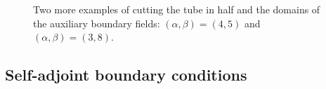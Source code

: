 \documentclass[12pt]{article}
\begin{document}
\begin{figure}   %
\hfill
{}
\caption{\small Two more examples of cutting the tube in half and the domains of the auxiliary boundary fields: $(\alpha,\beta)=(4,5)$ and $(\alpha,\beta)=(3,8)$.}
\label{fig:HalfTubes}
\end{figure}




\subsection{Self-adjoint boundary conditions}\label{sec:self-adjoint}  %
 
\end{document}
